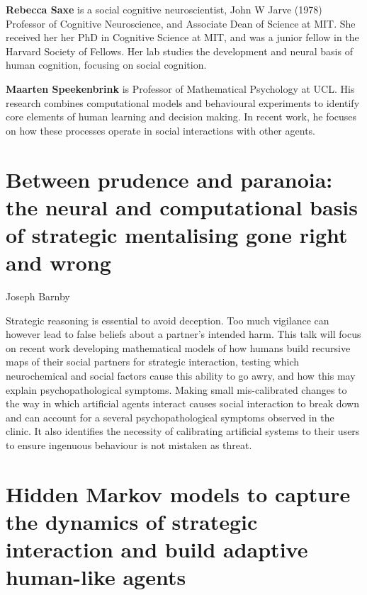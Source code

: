 \documentclass[10pt, letterpaper]{article}
\begin{document}
\textbf{Rebecca Saxe} is a social cognitive neuroscientist, John W Jarve
(1978) Professor of Cognitive Neuroscience, and Associate Dean of
Science at MIT. She received her her PhD in Cognitive Science at MIT,
and was a junior fellow in the Harvard Society of Fellows. Her lab
studies the development and neural basis of human cognition, focusing on
social cognition.

\textbf{Maarten Speekenbrink} is Professor of Mathematical Psychology at
UCL. His research combines computational models and behavioural
experiments to identify core elements of human learning and decision
making. In recent work, he focuses on how these processes operate in
social interactions with other agents.

\hypertarget{between-prudence-and-paranoia-the-neural-and-computational-basis-of-strategic-mentalising-gone-right-and-wrong}{%
\section{Between prudence and paranoia: the neural and computational
basis of strategic mentalising gone right and
wrong}\label{between-prudence-and-paranoia-the-neural-and-computational-basis-of-strategic-mentalising-gone-right-and-wrong}}

\begin{center}
Joseph Barnby
\end{center}

Strategic reasoning is essential to avoid deception. Too much vigilance
can however lead to false beliefs about a partner's intended harm. This
talk will focus on recent work developing mathematical models of how
humans build recursive maps of their social partners for strategic
interaction, testing which neurochemical and social factors cause this
ability to go awry, and how this may explain psychopathological
symptoms. Making small mis-calibrated changes to the way in which
artificial agents interact causes social interaction to break down and
can account for a several psychopathological symptoms observed in the
clinic. It also identifies the necessity of calibrating artificial
systems to their users to ensure ingenuous behaviour is not mistaken as
threat.

\hypertarget{hidden-markov-models-to-capture-the-dynamics-of-strategic-interaction-and-build-adaptive-human-like-agents}{%
\section{Hidden Markov models to capture the dynamics of strategic
interaction and build adaptive human-like
agents}\label{hidden-markov-models-to-capture-the-dynamics-of-strategic-interaction-and-build-adaptive-human-like-agents}}
\end{document}
